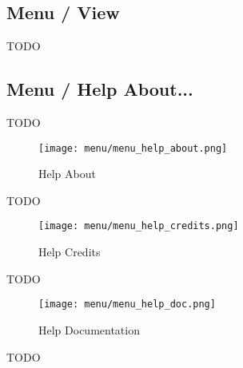 \subsection{Menu / View}
\label{subsec:seq24_menu_view}

   TODO

\subsection{Menu / Help About...}
\label{subsec:seq24_menu_about}

   TODO

\begin{figure}[H]
   \centering 
   \texttt{[image: menu/menu\_help\_about.png]}
   \caption{Help About}
   \label{fig:seq24_menu_help_about}
\end{figure}

   TODO

\begin{figure}[H]
   \centering 
   \texttt{[image: menu/menu\_help\_credits.png]}
   \caption{Help Credits}
   \label{fig:seq24_menu_help_credits}
\end{figure}

   TODO

\begin{figure}[H]
   \centering 
   \texttt{[image: menu/menu\_help\_doc.png]}
   \caption{Help Documentation}
   \label{fig:seq24_menu_help_doc}
\end{figure}

   TODO


